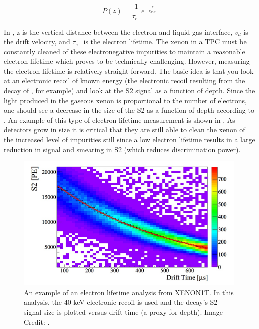 \begin{equation}
        \label{eqn:tpc_electron_lifetime}
        P(z) = \frac{1}{\tau_{e^-}} e^{-\frac{z}{v_d \tau_{e^-}}}
\end{equation}

In , z is the vertical distance between the electron and liquid-gas interface, $v_d$ is the drift velocity, and $\tau_{e^-}$ is the electron lifetime.  The xenon in a TPC must be constantly cleaned of these electronegative impurities to maintain a reasonable electron lifetime which proves to be technically challenging.  However, measuring the electron lifetime is relatively straight-forward.  The basic idea is that you look at an electronic recoil of known energy (the electronic recoil resulting from the decay of , for example) and look at the S2 signal as a function of depth.   Since the light produced in the gaseous xenon is proportional to the number of electrons, one should see a decrease in the size of the S2 as a function of depth according to .  An example of this type of electron lifetime measurement is shown in .  As detectors grow in size it is critical that they are still able to clean the xenon of the increased level of impurities still since a low electron lifetime results in a large reduction in signal and smearing in S2 (which reduces discrimination power).

 \begin{figure}[t]
	\centering
	\includegraphics[width=0.99\textwidth]{tpc_electron_lifetime}
	\caption{An example of an electron lifetime analysis from XENON1T.  In this analysis, the 40 keV  electronic recoil is used and the decay's S2 signal size is plotted versus drift time (a proxy for depth).  Image Credit: .}
	\label{fig:tpc_electron_lifetime}
\end{figure}

